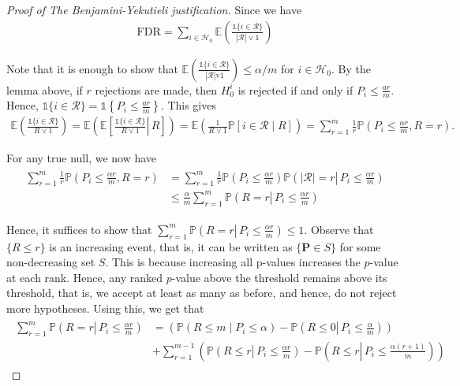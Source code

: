\begin{proof}[Proof of The Benjamini-Yekutieli justification]
Since we have
\begin{align*}
\mathrm{FDR}=\sum_{i \in \mathcal{H}_0} \mathbb{E}\left(\frac{\mathbb{1}\{i \in \mathcal{R}\}}{|\mathcal{R}| \vee 1}\right)
\end{align*}

Note that it is enough to show that $\mathbb{E}\left(\frac{\mathbb{1}\{i \in \mathcal{R}\}}{|\mathcal{R}| \mathrm{v} 1}\right) \leq \alpha / m$ for $i \in \mathcal{H}_0$.
By the lemma above, if $r$ rejections are made, then $H_0^i$ is rejected if and only if $P_i \leq \frac{a r}{m}$. Hence, $\mathbb{1}\{i \in \mathcal{R}\}=\mathbb{1}\left\{P_i \leq \frac{a r}{m}\right\}$. This gives
\begin{align*}
\mathbb{E}\left(\frac{\mathbb{1}\{i \in \mathcal{R}\}}{R \vee 1}\right)=\mathbb{E}\left(\mathbb{E}\left[\left.\frac{\mathbb{1}\{i \in \mathcal{R}\}}{R \vee 1} \right\rvert\, R\right]\right)=\mathbb{E}\left(\frac{1}{R \vee 1} \mathbb{P}[i \in \mathcal{R} \mid R]\right)=\sum_{r=1}^m \frac{1}{r} \mathbb{P}\left(P_i \leq \frac{\alpha r}{m}, R=r\right) .
\end{align*}


For any true null, we now have
\begin{align*}
\begin{aligned}
\sum_{r=1}^m \frac{1}{r} \mathbb{P}\left(P_i \leq \frac{\alpha r}{m}, R=r\right) & =\sum_{r=1}^m \frac{1}{r} \mathbb{P}\left(P_i \leq \frac{\alpha r}{m}\right) \mathbb{P}\left(|\mathcal{R}|=r \left\lvert\, P_i \leq \frac{\alpha r}{m}\right.\right) \\
& \leq \frac{\alpha}{m} \sum_{r=1}^m \mathbb{P}\left(R=r \left\lvert\, P_i \leq \frac{\alpha r}{m}\right.\right)
\end{aligned}
\end{align*}


Hence, it suffices to show that $\sum_{r=1}^m \mathbb{P}\left(R=r \left\lvert\, P_i \leq \frac{\alpha r}{m}\right.\right) \leq 1$. Observe that $\{R \leq r\}$ is an increasing event, that is, it can be written as $\{\boldsymbol{P} \in S\}$ for some non-decreasing set $S$. This is because increasing all p-values increases the $p$-value at each rank. Hence, any ranked $p$-value above the threshold remains above its threshold, that is, we accept at least as many as before, and hence, do not reject more hypotheses. Using this, we get that
\begin{align*}
\begin{aligned}
\sum_{r=1}^m \mathbb{P}\left(R=r \left\lvert\, P_i \leq \frac{\alpha r}{m}\right.\right) & =\left(\mathbb{P}\left(R \leq m \mid P_i \leq \alpha\right)-\mathbb{P}\left(R \leq 0 \left\lvert\, P_i \leq \frac{\alpha}{m}\right.\right)\right) \\
& +\sum_{r=1}^{m-1}\left(\mathbb{P}\left(R \leq r \left\lvert\, P_i \leq \frac{\alpha r}{m}\right.\right)-\mathbb{P}\left(R \leq r \left\lvert\, P_i \leq \frac{\alpha(r+1)}{m}\right.\right)\right)
\end{aligned}
\end{align*}



\end{proof}
